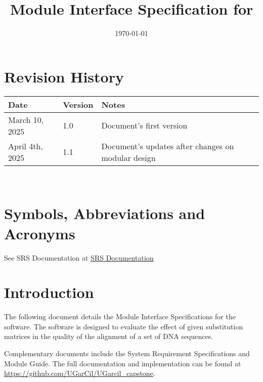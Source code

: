 \documentclass[12pt, titlepage]{article}
\begin{document}
\title{Module Interface Specification for \progname{}}

\author{\authname}

\date{\today}

\maketitle


\section{Revision History}

\begin{tabularx}{\textwidth}{p{3cm}p{2cm}X}
\toprule {\bf Date} & {\bf Version} & {\bf Notes}\\
\midrule
March 10, 2025 & 1.0 & Document's first version\\
April 4th, 2025 & 1.1 & Document's updates after changes on modular design\\
\bottomrule
\end{tabularx}

~\newpage

\section{Symbols, Abbreviations and Acronyms}
See SRS Documentation at \href{https://github.com/UGarCil/UGarcil_capstone/blob/main/docs/SRS/SRS.pdf}{SRS Documentation}


\newpage

\tableofcontents

\newpage


\section{Introduction}

The following document details the Module Interface Specifications for
the \progname software. The software is designed to evaluate the effect of 
given substitution matrices in the quality of the alignment of a set of DNA sequences.

Complementary documents include the System Requirement Specifications
and Module Guide.  The full documentation and implementation can be
found at \url{https://github.com/UGarCil/UGarcil_capstone}.
\end{document}
